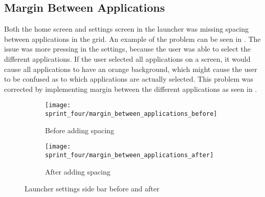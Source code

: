 \subsection{Margin Between Applications}
\label{sec:margin_between_applications}
Both the home screen and settings screen in the launcher was missing spacing between applications in the grid. An example of the problem can be seen in . The issue was more pressing in the settings, because the user was able to select the different applications. If the user selected all applications on a screen, it would cause all applications to have an orange background, which might cause the user to be confused as to which applications are actually selected. This problem was corrected by implementing margin between the different applications as seen in .  


\begin{figure}[!htbp]
    \centering

    \begin{subfigure}[t]{0.75\textwidth}
        \texttt{[image: sprint\_four/margin\_between\_applications\_before]}
        \caption{Before adding spacing}
        \label{fig:margin_between_applications_before}
        \vspace*{1cm}
    \end{subfigure}
    \begin{subfigure}[t]{0.75\textwidth}
        \texttt{[image: sprint\_four/margin\_between\_applications\_after]}
        \caption{After adding spacing}
        \label{fig:margin_between_applications_after}
    \end{subfigure}
    
    \caption{Launcher settings side bar before and after}
    \label{fig:margin_between_applications}
\end{figure}

\FloatBarrier